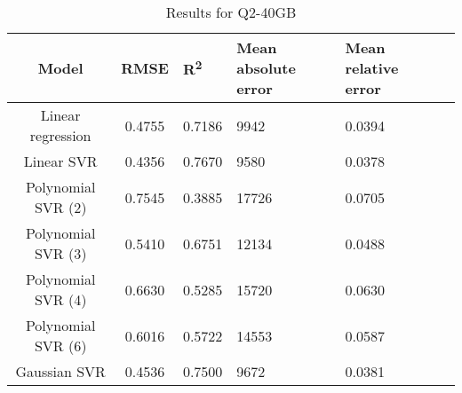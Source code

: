 \begin{table}[H]
\centering
\begin{adjustbox}{center}
\begin{tabular}{c | c M{1.2cm} M{2.5cm} M{2.5cm} M{1.8cm}}
Model & RMSE & R\textsuperscript{2} & Mean absolute error & Mean relative error \tabularnewline
\hline
Linear regression & 0.4755 & 0.7186 &   9942 & 0.0394 \\
Linear SVR & 0.4356 & 0.7670 &   9580 & 0.0378 \\
Polynomial SVR (2) & 0.7545 & 0.3885 &  17726 & 0.0705 \\
Polynomial SVR (3) & 0.5410 & 0.6751 &  12134 & 0.0488 \\
Polynomial SVR (4) & 0.6630 & 0.5285 &  15720 & 0.0630 \\
Polynomial SVR (6) & 0.6016 & 0.5722 &  14553 & 0.0587 \\
Gaussian SVR & 0.4536 & 0.7500 &   9672 & 0.0381 \\
\end{tabular}
\end{adjustbox}
\\
\caption{Results for Q2-40GB}
\label{tab:all_linear_Q2_40}
\end{table}

